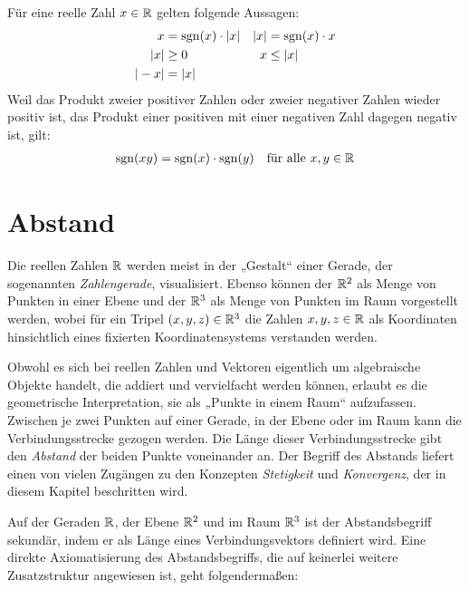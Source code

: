 \begin{bem}
    Für eine reelle Zahl $x\in \mathbb R$ gelten folgende Aussagen:
    \begin{align*}
        x & = \operatorname{sgn}(x)\cdot \vert x\vert & \vert x \vert & = \operatorname{sgn}(x)\cdot x \\
        \vert x\vert & \ge 0 & x & \le \vert x\vert \\
        \vert -x\vert & = \vert x\vert
    \end{align*}
    Weil das Produkt zweier positiver Zahlen oder zweier negativer Zahlen wieder positiv ist, das Produkt einer positiven mit einer negativen Zahl dagegen negativ ist, gilt:
    \begin{align*}
        \operatorname{sgn}(xy) = \operatorname{sgn}(x)\cdot \operatorname{sgn}(y) && \text{für alle $x,y\in \mathbb R$}
    \end{align*}
\end{bem}





\section{Abstand}


\begin{bem}
    Die reellen Zahlen $\mathbb R$ werden meist in der „Gestalt“ einer Gerade, der sogenannten \emph{Zahlengerade}, visualisiert. Ebenso können der $\mathbb R^2$ als Menge von Punkten in einer Ebene und der $\mathbb R^3$ als Menge von Punkten im Raum vorgestellt werden, wobei für ein Tripel $(x,y,z)\in \mathbb R^3$ die Zahlen $x,y,z\in \mathbb R$ als Koordinaten hinsichtlich eines fixierten Koordinatensystems verstanden werden.
    
    Obwohl es sich bei reellen Zahlen und Vektoren eigentlich um algebraische Objekte handelt, die addiert und vervielfacht werden können, erlaubt es die geometrische Interpretation, sie als „Punkte in einem Raum“ aufzufassen. Zwischen je zwei Punkten auf einer Gerade, in der Ebene oder im Raum kann die Verbindungsstrecke gezogen werden. Die Länge dieser Verbindungsstrecke gibt den \emph{Abstand} der beiden Punkte voneinander an. Der Begriff des Abstands liefert einen von vielen Zugängen zu den Konzepten \emph{Stetigkeit} und \emph{Konvergenz}, der in diesem Kapitel beschritten wird.
    
    Auf der Geraden $\mathbb R$, der Ebene $\mathbb R^2$ und im Raum $\mathbb R^3$ ist der Abstandsbegriff sekundär, indem er als Länge eines Verbindungsvektors definiert wird. Eine direkte Axiomatisierung des Abstandsbegriffs, die auf keinerlei weitere Zusatzstruktur angewiesen ist, geht folgendermaßen:
\end{bem}


